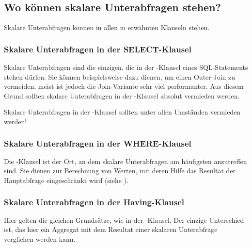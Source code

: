 \subsection{Wo können skalare Unterabfragen stehen?}
Skalare Unterabfragen können in allen in  erwähnten Klauseln stehen.
\subsubsection{Skalare Unterabfragen in der SELECT-Klausel}
Skalare Unterabfragen sind die einzigen, die in der \SELECT-Klausel eines SQL-Statements stehen dürfen. Sie können beispielsweise dazu dienen, um einen Outer-Join zu vermeiden, meist ist jedoch die Join-Variante sehr viel performanter. Aus diesem Grund sollten skalare Unterabfragen in der \SELECT-Klausel absolut vermieden werden.

\begin{merke}
    Skalare Unterabfragen in der \SELECT-Klausel sollten unter allen Umständen vermieden werden!
\end{merke}
\subsubsection{Skalare Unterabfragen in der WHERE-Klausel}
Die \WHERE-Klausel ist der Ort, an dem skalare Unterabfragen am häufigsten anzutreffen sind. Sie dienen zur Berechnung von Werten, mit deren Hilfe das Resultat der Hauptabfrage eingeschränkt wird (siehe ).
\subsubsection{Skalare Unterabfragen in der Having-Klausel}
Hier gelten die gleichen Grundsätze, wie in der \WHERE-Klausel. Der einzige Unterschied ist, das hier ein Aggregat mit dem Resultat einer skalaren Unterabfrage verglichen werden kann.
